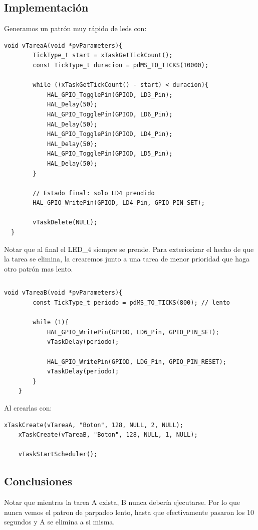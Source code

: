 \documentclass[12pt]{article}
\begin{document}
\subsection{Implementación}
Generamos un patrón muy rápido de leds con:
\begin{lstlisting}[style=CStyle]
    void vTareaA(void *pvParameters){
        TickType_t start = xTaskGetTickCount();
        const TickType_t duracion = pdMS_TO_TICKS(10000);
    
        while ((xTaskGetTickCount() - start) < duracion){
            HAL_GPIO_TogglePin(GPIOD, LD3_Pin);
            HAL_Delay(50);
            HAL_GPIO_TogglePin(GPIOD, LD6_Pin);
            HAL_Delay(50);
            HAL_GPIO_TogglePin(GPIOD, LD4_Pin);
            HAL_Delay(50);
            HAL_GPIO_TogglePin(GPIOD, LD5_Pin);
            HAL_Delay(50);
        }
    
        // Estado final: solo LD4 prendido
        HAL_GPIO_WritePin(GPIOD, LD4_Pin, GPIO_PIN_SET);
    
        vTaskDelete(NULL);
  }
\end{lstlisting}
Notar que al final el LED\_4 siempre se prende.
Para exteriorizar el hecho de que la tarea 
se elimina, la crearemos junto a una tarea de menor
prioridad que haga otro patrón mas lento.

\begin{lstlisting}[style=CStyle]

\end{lstlisting}
\begin{lstlisting}[style=CStyle]
    void vTareaB(void *pvParameters){
        const TickType_t periodo = pdMS_TO_TICKS(800); // lento

        while (1){
            HAL_GPIO_WritePin(GPIOD, LD6_Pin, GPIO_PIN_SET);
            vTaskDelay(periodo);

            HAL_GPIO_WritePin(GPIOD, LD6_Pin, GPIO_PIN_RESET);
            vTaskDelay(periodo);
        }
    }
\end{lstlisting}
Al crearlas con:
\begin{lstlisting}[style=CStyle]
    xTaskCreate(vTareaA, "Boton", 128, NULL, 2, NULL);
    xTaskCreate(vTareaB, "Boton", 128, NULL, 1, NULL);
  
    vTaskStartScheduler();
\end{lstlisting}
\subsection{Conclusiones}

Notar que mientras la tarea A exista, B nunca debería ejecutarse.
Por lo que nunca vemos el patron de parpadeo lento, hasta que 
efectivamente pasaron los 10 segundos y A se elimina a si misma.
\end{document}
